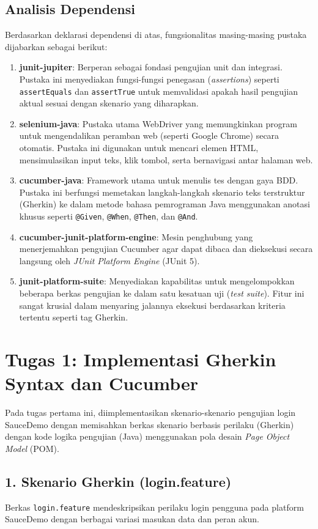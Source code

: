\documentclass[a4paper,oneside,11pt]{book}
\begin{document}
\subsection{Analisis Dependensi}
Berdasarkan deklarasi dependensi di atas, fungsionalitas masing-masing pustaka dijabarkan sebagai berikut:
\begin{enumerate}
    \item \textbf{junit-jupiter}: Berperan sebagai fondasi pengujian unit dan integrasi. Pustaka ini menyediakan fungsi-fungsi penegasan (\textit{assertions}) seperti \texttt{assertEquals} dan \texttt{assertTrue} untuk memvalidasi apakah hasil pengujian aktual sesuai dengan skenario yang diharapkan.
    \item \textbf{selenium-java}: Pustaka utama WebDriver yang memungkinkan program untuk mengendalikan peramban web (seperti Google Chrome) secara otomatis. Pustaka ini digunakan untuk mencari elemen HTML, mensimulasikan input teks, klik tombol, serta bernavigasi antar halaman web.
    \item \textbf{cucumber-java}: Framework utama untuk menulis tes dengan gaya BDD. Pustaka ini berfungsi memetakan langkah-langkah skenario teks terstruktur (Gherkin) ke dalam metode bahasa pemrograman Java menggunakan anotasi khusus seperti \texttt{@Given}, \texttt{@When}, \texttt{@Then}, dan \texttt{@And}.
    \item \textbf{cucumber-junit-platform-engine}: Mesin penghubung yang menerjemahkan pengujian Cucumber agar dapat dibaca dan dieksekusi secara langsung oleh \textit{JUnit Platform Engine} (JUnit 5).
    \item \textbf{junit-platform-suite}: Menyediakan kapabilitas untuk mengelompokkan beberapa berkas pengujian ke dalam satu kesatuan uji (\textit{test suite}). Fitur ini sangat krusial dalam menyaring jalannya eksekusi berdasarkan kriteria tertentu seperti tag Gherkin.
\end{enumerate}

\section{Tugas 1: Implementasi Gherkin Syntax dan Cucumber}
Pada tugas pertama ini, diimplementasikan skenario-skenario pengujian login SauceDemo dengan memisahkan berkas skenario berbasis perilaku (Gherkin) dengan kode logika pengujian (Java) menggunakan pola desain \textit{Page Object Model} (POM).

\subsection{1. Skenario Gherkin (login.feature)}
Berkas \texttt{login.feature} mendeskripsikan perilaku login pengguna pada platform SauceDemo dengan berbagai variasi masukan data dan peran akun.
\end{document}
